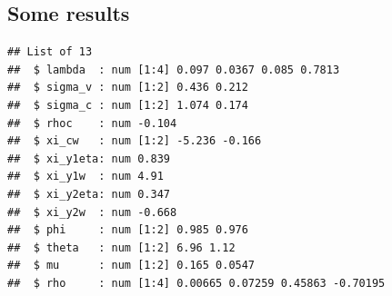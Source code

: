 \documentclass{article}\usepackage[]{graphicx}\usepackage[]{color}
\makeatletter
\newenvironment{kframe}{%
 \def\at@end@of@kframe{}%
 \ifinner\ifhmode%
  \def\at@end@of@kframe{\end{minipage}}%
  \begin{minipage}{\columnwidth}%
 \fi\fi%
 \def\FrameCommand##1{\hskip\@totalleftmargin \hskip-\fboxsep
 \colorbox{shadecolor}{##1}\hskip-\fboxsep
     \hskip-\linewidth \hskip-\@totalleftmargin \hskip\columnwidth}%
 \MakeFramed {\advance\hsize-\width
   \@totalleftmargin\z@ \linewidth\hsize
   \@setminipage}}%
 {\par\unskip\endMakeFramed%
 \at@end@of@kframe}
\newenvironment{knitrout}{}{} %
\makeatother
\begin{document}
\subsection{Some results}
\begin{knitrout}
\color{fgcolor}\begin{kframe}


{\ttfamily\noindent\itshape\color{messagecolor}{\#\# \\\#\# Attaching package: 'dplyr'}}

{\ttfamily\noindent\itshape\color{messagecolor}{\#\# The following objects are masked from 'package:stats':\\\#\# \\\#\# \ \ \ \ filter, lag}}

{\ttfamily\noindent\itshape\color{messagecolor}{\#\# The following objects are masked from 'package:base':\\\#\# \\\#\# \ \ \ \ intersect, setdiff, setequal, union}}\begin{verbatim}
## List of 13
##  $ lambda  : num [1:4] 0.097 0.0367 0.085 0.7813
##  $ sigma_v : num [1:2] 0.436 0.212
##  $ sigma_c : num [1:2] 1.074 0.174
##  $ rhoc    : num -0.104
##  $ xi_cw   : num [1:2] -5.236 -0.166
##  $ xi_y1eta: num 0.839
##  $ xi_y1w  : num 4.91
##  $ xi_y2eta: num 0.347
##  $ xi_y2w  : num -0.668
##  $ phi     : num [1:2] 0.985 0.976
##  $ theta   : num [1:2] 6.96 1.12
##  $ mu      : num [1:2] 0.165 0.0547
##  $ rho     : num [1:4] 0.00665 0.07259 0.45863 -0.70195
\end{verbatim}
\end{kframe}
\end{knitrout}
\end{document}
